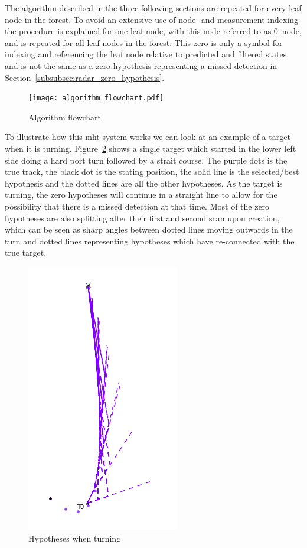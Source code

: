  The algorithm described in the three following sections are repeated for every leaf node in the forest. To avoid an extensive use of node- and measurement indexing the procedure is explained for one leaf node, with this node referred to as 0--node, and is repeated for all leaf nodes in the forest. This zero is only a symbol for indexing and referencing the leaf node relative to predicted and filtered states, and is not the same as a zero-hypothesis representing a missed detection in Section~\ref{subsubsec:radar_zero_hypothesis}. 
\begin{figure}[H]
\centering
\texttt{[image: algorithm\_flowchart.pdf]}
\caption{Algorithm flowchart}\label{fig:algorithm_flow}
\end{figure}

To illustrate how this \gls{mht} system works we can look at an example of a target when it is turning. Figure~\ref{fig:hypotheses_when_turning} shows a single target which started in the lower left side doing a hard port turn followed by a strait course. The purple dots is the true track, the black dot is the stating position, the solid line is the selected/best hypothesis and the dotted lines are all the other hypotheses. As the target is turning, the zero hypotheses will continue in a straight line to allow for the possibility that there is a missed detection at that time. Most of the zero hypotheses are also splitting after their first and second scan upon creation, which can be seen as sharp angles between dotted lines moving outwards in the turn and dotted lines representing hypotheses which have re-connected with the true target.
\begin{figure}[H]
\centering
\includegraphics[height = .5\textheight]{Figures/Hypotheses_when_turning.PNG}
\caption{Hypotheses when turning}\label{fig:hypotheses_when_turning}
\end{figure}

